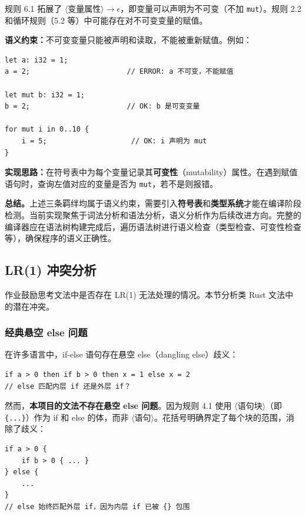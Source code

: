 \documentclass[12pt,a4paper]{ctexart}
\begin{document}
规则 6.1 拓展了 $\langle\text{变量属性}\rangle \rightarrow \epsilon$，即变量可以声明为不可变（不加 \texttt{mut}）。规则 2.2 和循环规则（5.2 等）中可能存在对不可变变量的赋值。

\textbf{语义约束：}不可变变量只能被声明和读取，不能被重新赋值。例如：

\begin{lstlisting}[language=RustLike]
let a: i32 = 1;
a = 2;                       // ERROR: a 不可变，不能赋值

let mut b: i32 = 1;
b = 2;                       // OK: b 是可变变量

for mut i in 0..10 {
    i = 5;                    // OK: i 声明为 mut
}
\end{lstlisting}

\textbf{实现思路：}在符号表中为每个变量记录其\textbf{可变性}（mutability）属性。在遇到赋值语句时，查询左值对应的变量是否为 \texttt{mut}，若不是则报错。

\textbf{总结。}上述三条羁绊均属于语义约束，需要引入\textbf{符号表}和\textbf{类型系统}才能在编译阶段检测。当前实现聚焦于词法分析和语法分析，语义分析作为后续改进方向。完整的编译器应在语法树构建完成后，遍历语法树进行语义检查（类型检查、可变性检查等），确保程序的语义正确性。

\subsection{LR(1) 冲突分析}

作业鼓励思考文法中是否存在 LR(1) 无法处理的情况。本节分析类 Rust 文法中的潜在冲突。

\subsubsection{经典悬空 else 问题}

在许多语言中，if-else 语句存在悬空 else（dangling else）歧义：

\begin{lstlisting}[language=RustLike]
if a > 0 then if b > 0 then x = 1 else x = 2
// else 匹配内层 if 还是外层 if？
\end{lstlisting}

然而，\textbf{本项目的文法不存在悬空 else 问题}。因为规则 4.1 使用 $\langle\text{语句块}\rangle$（即 \texttt{\{...\}}）作为 if 和 else 的体，而非 $\langle\text{语句}\rangle$。花括号明确界定了每个块的范围，消除了歧义：

\begin{lstlisting}[language=RustLike]
if a > 0 {
    if b > 0 { ... }
} else {
    ...
}
// else 始终匹配外层 if，因为内层 if 已被 {} 包围
\end{lstlisting}
\end{document}
